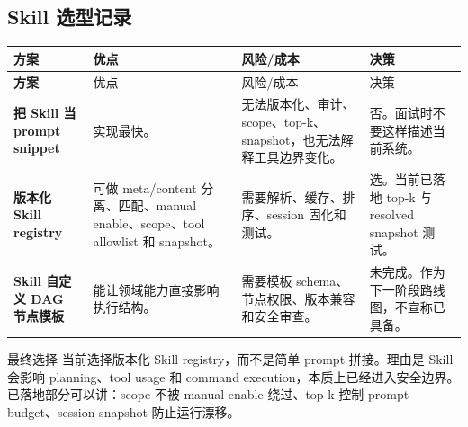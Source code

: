 \subsection{Skill 选型记录}
\begin{longtable}{>{\bfseries}p{}p{}p{}p{}}
\toprule
方案 & 优点 & 风险/成本 & 决策 \\
\midrule
\endfirsthead
\toprule
方案 & 优点 & 风险/成本 & 决策 \\
\midrule
\endhead
把 Skill 当 prompt snippet & 实现最快。 & 无法版本化、审计、scope、top-k、snapshot，也无法解释工具边界变化。 & 否。面试时不要这样描述当前系统。 \\
版本化 Skill registry & 可做 meta/content 分离、匹配、manual enable、scope、tool allowlist 和 snapshot。 & 需要解析、缓存、排序、session 固化和测试。 & 选。当前已落地 top-k 与 resolved snapshot 测试。 \\
Skill 自定义 DAG 节点模板 & 能让领域能力直接影响执行结构。 & 需要模板 schema、节点权限、版本兼容和安全审查。 & 未完成。作为下一阶段路线图，不宣称已具备。 \\
\bottomrule
\end{longtable}

\begin{analysisBox}{最终选择}
当前选择版本化 Skill registry，而不是简单 prompt 拼接。理由是 Skill 会影响 planning、tool usage 和 command execution，本质上已经进入安全边界。已落地部分可以讲：scope 不被 manual enable 绕过、top-k 控制 prompt budget、session snapshot 防止运行漂移。
\end{analysisBox}

